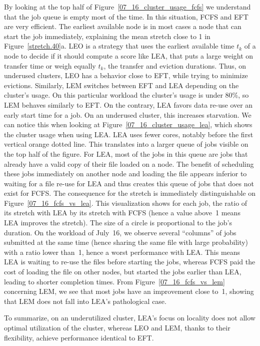 \documentclass[sigconf,review,anonymous]{acmart}
\begin{document}
By looking at the top half of Figure~\ref{07_16_cluster_usage_fcfs}
we understand that the job queue is empty most of the time.
In this situation, FCFS and EFT are very efficient. The earliest available node is in
most cases a node that can start the job immediately, explaining the mean stretch close to 1 in Figure~\ref{stretch.40}a.
LEO is a strategy that uses the earliest available time $t_k$ of a node to decide if it should compute a score like LEA,
that puts a large weight on transfer time
or weigh equally $t_k$, the transfer and eviction durations. 
Thus, on underused clusters, LEO has a behavior close to EFT, while trying to minimize evictions.
Similarly, LEM switches between EFT and LEA depending on the cluster's usage.
On this particular workload the cluster's usage is under 80\%, so LEM behaves similarly to EFT.
On the contrary, LEA favors data re-use over an early start time for a job.
On an underused cluster, this increases starvation.
We can notice this when looking at
Figure~\ref{07_16_cluster_usage_lea}, which shows the cluster usage when using LEA.
LEA uses fewer cores, notably before the first vertical orange dotted line. 
This translates into a larger queue of jobs visible on the top half of the figure.
For LEA, most of the jobs in this queue are jobs that already have a valid copy of their file loaded on a node. 
The benefit of scheduling these jobs immediately on another node and loading the file appears
inferior to waiting for a file re-use for LEA and thus creates this queue of jobs that does not exist for FCFS. 
The consequence for the stretch is immediately distinguishable on Figure~\ref{07_16_fcfs_vs_lea}.
This visualization shows for each job, the ratio of its stretch with LEA by its stretch with FCFS (hence a value above~1 means LEA improves the stretch).
The size of a circle is proportional to the job's duration.
On the workload of July~16, we observe several ``columns'' of jobs submitted at the same time (hence sharing the same file with large probability)
with a ratio lower than~1, hence a worst performance with LEA.
This means LEA is waiting to re-use the files before starting the jobs,
whereas FCFS paid the cost of loading the file on other nodes, but started the jobs
earlier than LEA, leading to shorter completion times.
From Figure~\ref{07_16_fcfs_vs_lem} concerning LEM, we see that most jobs have an improvement close to~1, showing 
that LEM does not fall into LEA's pathological case.

To summarize, on an underutilized cluster, LEA's focus on locality
does not allow optimal utilization of the cluster, whereas LEO and LEM, thanks
to their flexibility,
achieve performance identical to EFT.
\end{document}
